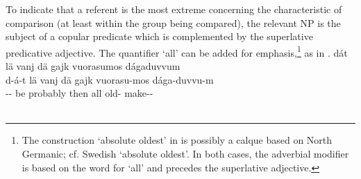 To indicate that a referent is the most extreme concerning the characteristic of comparison (at least within the group being compared), the relevant NP is the subject of a copular predicate which is complemented by the superlative predicative adjective. The quantifier  ‘all’ can be added for emphasis,\footnote{The construction  ‘absolute oldest’ in  is possibly a calque based on North Germanic; cf. Swedish  ‘absolute oldest’. In both cases, the adverbial modifier is based on the word for ‘all’ and precedes the superlative adjective.} 
as in .
\ea\label{comparingNPsEx5}
\glll	dát lä vanj dä gajk vuorasumos dágaduvvum\\
	d-á-t lä vanj dä gajk vuorasu-mos dága-duvvu-m\\
	-- be\BS{} probably then all old-\BS{} make--\\\nopagebreak
{}\\	
\z





